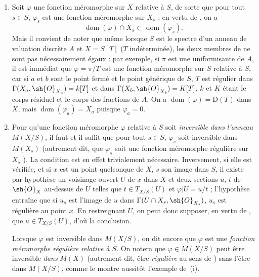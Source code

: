 \begin{remarks}[20.6.5]
\begin{enumerate}[label=(\roman*)]
  \item Soit $\varphi$ une fonction méromorphe sur $X$ relative à $S$, de sorte que pour tout $s\in S$, $\varphi_s$ est une fonction méromorphe sur $X_s$  ; en vertu de , on a
  \[
  \label{IV.20.6.5.1}
    \operatorname{dom}(\varphi)\cap X_s\subset\operatorname{dom}(\varphi_s).
    \tag{20.6.5.1}
  \]
  Mais il convient de noter que même lorsque $S$ est le spectre d'un anneau de valuation discrète $A$ et $X=S[T]$ ($T$ indéterminée), les deux membres de  ne sont pas nécessairement égaux : par exemple, si $\pi$ est une uniformisante de $A$, il est immédiat que $\varphi=\pi/T$ est une fonction méromorphe sur $S$ relative à $S$, car si $a$ et $b$ sont le point fermé et le point générique de $S$, $T$ est régulier dans $\Gamma(X_a,\sh{O}_{X_a})=k[T]$ et dans $\Gamma(X_b,\sh{O}_{X_b})=K[T]$, $k$ et $K$ étant le corps résiduel et le corps des fractions de $A$.
  On a $\operatorname{dom}(\varphi)=\mathrm{D}(T)$ dans $X$, mais $\operatorname{dom}(\varphi_a)=X_a$ puisque $\varphi_a=0$.

  \item Pour qu'une fonction méromorphe $\varphi$ relative à $S$ soit \emph{inversible dans l'anneau} $M(X/S)$, il faut et il suffit que pour tout $s\in S$, $\varphi_s$ soit inversible dans $M(X_s)$ (autrement dit, que $\varphi_s$ soit une fonction méromorphe régulière sur $X_s$ ).
  La condition est
  en effet trivialement nécessaire.
  Inversement, si elle est vérifiée, et si $x$ est un point quelconque de $X$, $s$ son image dans $S$, il existe par hypothèse un voisinage ouvert $U$ de $x$ dans $X$ et deux sections $u$, $t$ de $\sh{O}_X$ au-dessus de $U$ telles que $t\in T_{X/S}(U)$ et $\varphi|U=u/t$ ; l'hypothèse entraîne que si $u_s$ est l'image de $u$ dans $\Gamma(U\cap X_s,\sh{O}_{X_s})$, $u_s$ est régulière au point $x$.
  En restreignant $U$, on peut donc supposer, en vertu de , que $u\in T_{X/S}(U)$, d'où la conclusion.

  Lorsque $\varphi$ est inversible dans $M(X/S)$, on dit encore que $\varphi$ est une \emph{fonction méromorphe régulière relative à $S$}.
  On notera que $\varphi\in M(X/S)$ peut être inversible \emph{dans} $M(X)$ (autrement dit, être \emph{régulière} au sens de ) sans l'être dans $M(X/S)$, comme le montre aussitôt l'exemple de~(i).


\end{enumerate}
\end{remarks}
